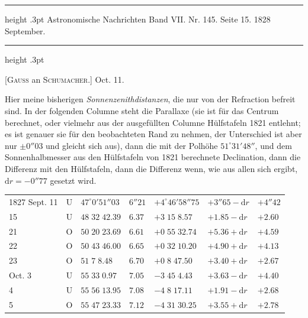 \par\bigskip
{}
\hypertarget{native-466-letter}{}
\begin{center}
\parbox{.81\linewidth}{%
\centering\small
\hrule height .3pt\relax\vspace{2.5pt}
Astronomische Nachrichten Band VII. Nr. 145. Seite 15. 1828 September.\par
\vspace{2.5pt}\hrule height .3pt\relax
}
\end{center}

\begin{center}[\textsc{Gauss} an \textsc{Schumacher.}] Oct. 11.\end{center}

Hier meine bisherigen \emph{Sonnenzenithdistanzen}, die nur von der Refraction befreit sind. In der folgenden Columne steht die Parallaxe (sie ist für das Centrum berechnet, oder vielmehr aus der ausgefüllten Columne Hülfstafeln 1821 entlehnt; es ist genauer sie für den beobachteten Rand zu nehmen, der Unterschied ist aber nur $\pm0''03$ und gleicht sich aus), dann die mit der Polhöhe $51^\circ31'48''$, und dem Sonnenhalbmesser aus den Hülfstafeln von 1821 berechnete Declination, dann die Differenz mit den Hülfstafeln, dann die Differenz wenn, wie aus allen sich ergibt, $\mathrm{d}r=-0''77$ gesetzt wird.

\begin{center}
\begingroup\fontsize{10}{12}\selectfont\setlength{\tabcolsep}{3pt}
\begin{tabular}{l|c|l|l|l|l|l}
1827 Sept. 11 & U & $47^\circ0'51''03$ & $6''21$ & $+4^\circ46'58''75$ & $+3''65-\mathrm{d}r$ & $+4''42$ \\
\hfill 15 & U & $48\;32\;42.39$ & $6.37$ & $+3\;15\;8.57$ & $+1.85-\mathrm{d}r$ & $+2.60$ \\
\hfill 21 & O & $50\;20\;23.69$ & $6.61$ & $+0\;55\;32.74$ & $+5.36+\mathrm{d}r$ & $+4.59$ \\
\hfill 22 & O & $50\;43\;46.00$ & $6.65$ & $+0\;32\;10.20$ & $+4.90+\mathrm{d}r$ & $+4.13$ \\
\hfill 23 & O & $51\;7\;8.48$ & $6.70$ & $+0\;8\;47.50$ & $+3.40+\mathrm{d}r$ & $+2.67$ \\
\hfill Oct. 3 & U & $55\;33\;0.97$ & $7.05$ & $-3\;45\;4.43$ & $+3.63-\mathrm{d}r$ & $+4.40$ \\
\hfill 4 & U & $55\;56\;13.95$ & $7.08$ & $-4\;8\;17.11$ & $+1.91-\mathrm{d}r$ & $+2.68$ \\
\hfill 5 & O & $55\;47\;23.33$ & $7.12$ & $-4\;31\;30.25$ & $+3.55+\mathrm{d}r$ & $+2.78$ \\
\end{tabular}
\endgroup
\end{center}

